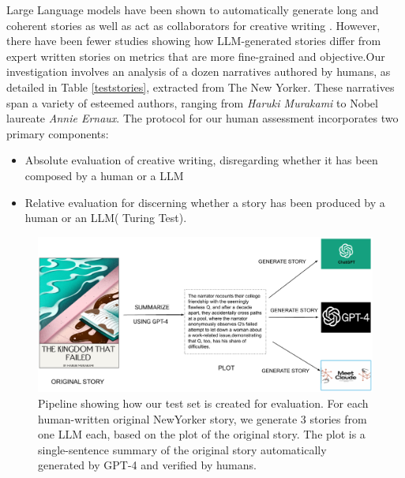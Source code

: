 Large Language models have been shown to automatically generate long and coherent stories \cite{yang2022doc,yang2022re3} as well as act as collaborators for creative writing \cite{yuan2022wordcraft,ippolito2022creative,mirowski2023cowriting}. However, there have been fewer studies showing how LLM-generated stories differ from expert written stories on metrics that are more fine-grained and objective.Our investigation involves an analysis of a dozen narratives authored by humans, as detailed in Table \ref{teststories}, extracted from The New Yorker. These narratives span a variety of esteemed authors, ranging from \textit{Haruki Murakami} to Nobel laureate \textit{Annie Ernaux}. The protocol for our human assessment incorporates two primary components: 

\begin{itemize}[leftmargin=*]
    \itemsep0em 
    \item Absolute evaluation of creative writing, disregarding whether it has been composed by a human or a LLM
    \item Relative evaluation for discerning whether a story has been produced by a human or an LLM( Turing Test).
\end{itemize}


\begin{figure}
\centering
\includegraphics[width=\textwidth]{figures/datapipeline.pdf}
\caption{\label{datapipeline}Pipeline showing how our test set is created for evaluation. For each human-written original NewYorker story, we generate 3 stories from one LLM each, based on the plot of the original story. The plot is a single-sentence summary of the original story automatically generated by GPT-4 and verified by humans.}
\end{figure}


